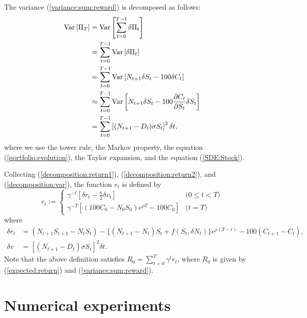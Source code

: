 \documentclass[11pt]{article}
\begin{document}
The variance (\ref{variance:sum:reward}) is decomposed as follows:
%
\begin{align}
	{\rm Var} \left[ \Pi_T \right] &= {\rm Var} \left[ \sum_{t=0}^{T-1} \delta \Pi_t \right] \\
	&= \sum_{t=0}^{T-1}  {\rm Var} \left[ \delta \Pi_t \right] \\
	&= \sum_{t=0}^{T-1}  {\rm Var} \left[ N_{t+1} \delta S_t - 100 \delta C_t \right] \\
	&\approx \sum_{t=0}^{T-1}  {\rm Var} \left[ N_{t+1} \delta S_t - 100 \frac{\partial C_t}{\partial S_t} \delta S_t \right] \\
	&= \sum_{t=0}^{T-1} \left[ (N_{t+1} - D_t) \sigma S_t \right]^2 \delta t, \label{decomposition:var}
\end{align}
%
where we use the tower rule, the Markov property, the equation (\ref{portfolio:evolution}), the Taylor expansion, and the equation (\ref{SDE:Stock}). 

Collecting (\ref{decomposition:return1}), (\ref{decomposition:return2}), and (\ref{decomposition:var}), the function $r_t$ is defined by
%
\begin{equation}
	r_t := \begin{cases}
	\gamma^{-t} \left[ \delta r_t - \frac{\kappa}{2} \delta v_t \right]  & \text{($0 \le t < T$)} \\
	\gamma^{-T} \left[ (100 C_0 - N_0 S_0) e^{\rho T} - 100 C_0 \right] & \text{($t = T$)}
	\end{cases}
\end{equation}
%
where
%
\begin{align}
	\delta r_t &= (N_{t+1} S_{t+1} - N_t S_t) - \{ (N_{t+1}-N_t) S_t + f(S_t, \delta N_t) \} e^{\rho (T-t)} - 100 (C_{t+1} - C_t), \\
	\delta v &= \left[ (N_{t+1} - D_t) \sigma S_t \right]^2 \delta t.
\end{align}
%
Note that the above definition satisfies $R_0 = \sum_{t=0}^{T} \gamma^t r_t$, where $R_0$ is given by (\ref{expected:return}) and (\ref{variance:sum:reward}).


\section{Numerical experiments}
\end{document}

